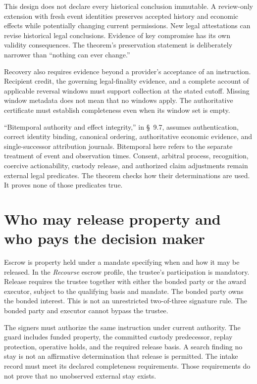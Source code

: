 \documentclass{momentum}
\begin{document}
This design does not declare every historical conclusion immutable. A review-only extension with fresh event identities preserves accepted history and economic effects while potentially changing current permissions. New legal attestations can revise historical legal conclusions. Evidence of key compromise has its own validity consequences. The theorem's preservation statement is deliberately narrower than ``nothing can ever change.''

Recovery also requires evidence beyond a provider's acceptance of an instruction. Recipient credit, the governing legal-finality evidence, and a complete account of applicable reversal windows must support collection at the stated cutoff. Missing window metadata does not mean that no windows apply. The authoritative certificate must establish completeness even when its window set is empty.

``Bitemporal authority and effect integrity,'' in \S~9.7, assumes authentication, correct identity binding, canonical ordering, authoritative economic evidence, and single-successor attribution journals. Bitemporal here refers to the separate treatment of event and observation times. Consent, arbitral process, recognition, coercive actionability, custody release, and authorized claim adjustments remain external legal predicates. The theorem checks how their determinations are used. It proves none of those predicates true.

\section{Who may release property and who pays the decision maker}

Escrow is property held under a mandate specifying when and how it may be released. In the \emph{Recourse} escrow profile, the trustee's participation is mandatory. Release requires the trustee together with either the bonded party or the award executor, subject to the qualifying basis and mandate. The bonded party owns the bonded interest. This is not an unrestricted two-of-three signature rule. The bonded party and executor cannot bypass the trustee.

The signers must authorize the same instruction under current authority. The guard includes funded property, the committed custody predecessor, replay protection, operative holds, and the required release basis. A search finding no stay is not an affirmative determination that release is permitted. The intake record must meet its declared completeness requirements. Those requirements do not prove that no unobserved external stay exists.
\end{document}
